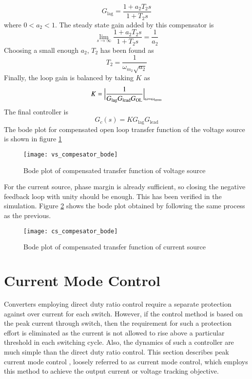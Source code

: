     \begin{equation}
    	G_{\text{lag}} = \dfrac{1+a_2T_2s}{1+T_2s}
	    \label{eq:55}    
    \end{equation}
    where $0 < a_2 < 1$.
    The steady state gain added by this compensator is 
    \begin{equation}
    	\lim_{s\to\infty} \dfrac{1+a_2T_2s}{1+T_2s} = \dfrac{1}{a_2}
	    \label{eq:56}    
    \end{equation}
    Choosing a small enough $a_2$, $T_2$ has been found as
    \begin{equation}
		T_2 = \dfrac{1}{\omega_{m_2}\sqrt{a_2}}
		\label{eq:57}
    \end{equation}
    Finally, the loop gain is balanced by taking $K$ as
    \begin{equation}
		K = \Bigl| \dfrac{1}{G_{\text{lag}} G_{\text{lead}} G_{\text{OL}}} \Bigr|_{\omega = \omega_{\text{cross}}}
		\label{eq:58}
    \end{equation}
    The final controller is
    \begin{equation}
		G_c(s) = K G_{\text{lag}} G_{\text{lead}}
		\label{eq:59}
    \end{equation}
    The bode plot for compensated open loop transfer function of the voltage source is shown in figure \ref{fig:comp-vs}
	\begin{figure}[h]
		\centering
		\texttt{[image: vs\_compesator\_bode]}
		\caption{Bode plot of compensated transfer function of voltage source}
		\label{fig:comp-vs}
	\end{figure}
	For the current source, phase margin is already sufficient, so closing the negative feedback loop with unity should be enough. This has been verified in the simulation. Figure \ref{fig:comp-cs} shows the bode plot obtained by following the same process as the previous.
	\begin{figure}[H]
		\centering
		\texttt{[image: cs\_compesator\_bode]}
		\caption{Bode plot of compensated transfer function of current source}
		\label{fig:comp-cs}
	\end{figure}

\section{Current Mode Control}
	Converters employing direct duty ratio control require a separate protection against over current for each switch. However, if the control method is based on the peak current through switch, then the requirement for such a protection effort is eliminated as the current is not allowed to rise above a particular threshold in each switching cycle. Also, the dynamics of such a controller are much simple than the direct duty ratio control. This section describes peak current mode control \cite{book:941109}, loosely referred to as current mode control, which employs this method to achieve the output current or voltage tracking objective.

